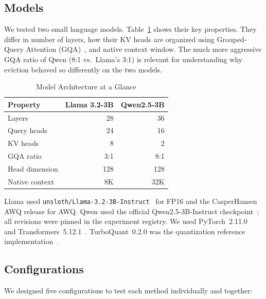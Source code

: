 \documentclass[sigconf,nonacm]{acmart}
\begin{document}
\subsection{Models}

We tested two small language models. Table~\ref{tab:geometry} shows their key
properties. They differ in number of layers, how their KV heads are organized
using Grouped-Query Attention (GQA)~\cite{ainslie2023gqa}, and native context window. The much more aggressive GQA ratio of
Qwen (8:1 vs.\ Llama's 3:1) is relevant for understanding why eviction behaved
so differently on the two models.

\begin{table}[htbp]
\caption{Model Architecture at a Glance}
\label{tab:geometry}
\centering\small
\begin{tabular}{lrr}
\toprule
\textbf{Property} & \textbf{Llama 3.2-3B} & \textbf{Qwen2.5-3B} \\
\midrule
Layers              & 28  & 36  \\
Query heads         & 24  & 16  \\
KV heads            & 8   & 2   \\
GQA ratio           & 3:1 & 8:1 \\
Head dimension      & 128 & 128 \\
Native context      & 8K  & 32K \\
\bottomrule
\end{tabular}
\end{table}

Llama used \texttt{unsloth/Llama-3.2-3B-Instruct}~\cite{unsloth_2024} for FP16 and the
CasperHansen AWQ release for AWQ. Qwen used the official Qwen2.5-3B-Instruct
checkpoint~\cite{qwen2024technical,qwen2024_qwen25_3b_instruct}; all revisions
were pinned in the experiment registry. We used PyTorch~2.11.0~\cite{paszke2019pytorch}
and Transformers~5.12.1~\cite{wolf2020transformers}. TurboQuant~0.2.0 was the
quantization reference implementation~\cite{zandieh_turboquant_2025,zandieh2026turboquant}.

\subsection{Configurations}

We designed five configurations to test each method individually and together:
\end{document}
